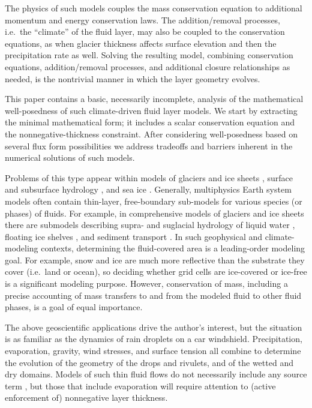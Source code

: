 \documentclass[final,onefignum]{siamart190516}
\begin{document}
The physics of such models couples the mass conservation equation to additional momentum and energy conservation laws.  The addition/removal processes, i.e.~the ``climate'' of the fluid layer, may also be coupled to the conservation equations, as when glacier thickness affects surface elevation and then the precipitation rate as well.  Solving the resulting model, combining conservation equations, addition/removal processes, and additional closure relationships as needed, is the nontrivial manner in which the layer geometry evolves.

This paper contains a basic, necessarily incomplete, analysis of the mathematical well-posedness of such climate-driven fluid layer models.  We start by extracting the minimal mathematical form; it includes a scalar conservation equation and the nonnegative-thickness constraint.  After considering well-posedness based on several flux form possibilities we address tradeoffs and barriers inherent in the numerical solutions of such models.

Problems of this type appear within models of glaciers and ice sheets \cite{Bueler2016,CalvoDuranyVazquez2000,DiazSchiavi1999,
EgholmNielsen2010,JouvetBueler2012,JouvetBuelerGraeserKornhuber2013}, surface and subsurface hydrology \cite{AlonsoSantillanaDawson2008,Maxwelletal2015}, and sea ice \cite{LipscombHunke2004,Thorndikeetal1975}.  Generally, multiphysics Earth system models often contain thin-layer, free-boundary sub-models for various species (or phases) of fluids.  For example, in comprehensive models of glaciers and ice sheets there are submodels describing supra- and suglacial hydrology of liquid water \cite{Aschwandenetal2012,BuelervanPelt2015,Schoofetal2012}, floating ice shelves \cite{Albrechtetal2011}, and sediment transport \cite{Brinkerhoffetal2017}.  In such geophysical and climate-modeling contexts, determining the fluid-covered area is a leading-order modeling goal.  For example, snow and ice are much more reflective than the substrate they cover (i.e.~land or ocean), so deciding whether grid cells are ice-covered or ice-free is a significant modeling purpose.  However, conservation of mass, including a precise accounting of mass transfers to and from the modeled fluid to other fluid phases, is a goal of equal importance.

The above geoscientific applications drive the author's interest, but the situation is as familiar as the dynamics of rain droplets on a car windshield.  Precipitation, evaporation, gravity, wind stresses, and surface tension all combine to determine the evolution of the geometry of the drops and rivulets, and of the wetted and dry domains.  Models of such thin fluid flows do not necessarily include any source term \cite[for example]{Kondic2003}, but those that include evaporation will require attention to (active enforcement of) nonnegative layer thickness.
\end{document}
